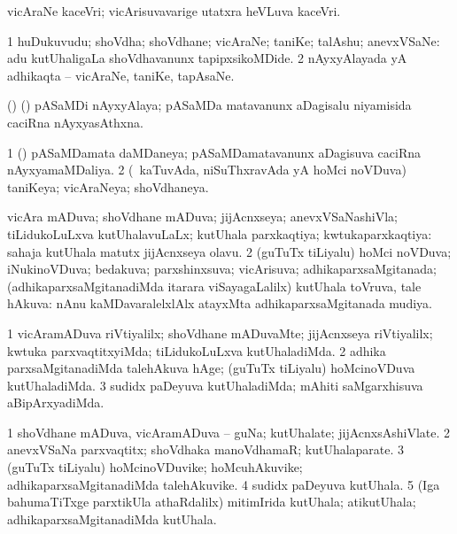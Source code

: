 \bentry
{}
\gl{\nA}
\bmng
vicAraNe kaceVri; vicArisuvavarige utatxra heVLuva kaceVri. 
\emng
\eentry

\bentry
{}
\gl{\nA}
\bmng
\bnum
\num{1} huDukuvudu; shoVdha; shoVdhane; vicAraNe; taniKe; talAshu; anevxVSaNe:  adu kutUhaligaLa shoVdhavanunx tapipxsikoMDide. 
\num{2} nAyxyAlayada yA adhikaqta -- vicAraNe, taniKe, tapAsaNe. 
\enum
\emng

\noindent 
\gl{\pagu}
\bmng
{} (\ca) (\roVkAyx) pASaMDi nAyxyAlaya; pASaMDa matavanunx aDagisalu niyamisida caciRna nAyxyasAthxna. 
\emng
\eentry

\bentry
{}
\gl{\gu}
\bmng
\bnum
\num{1} (\ca) pASaMDamata daMDaneya; pASaMDamatavanunx aDagisuva caciRna nAyxyamaMDaliya. 
\num{2} (\kanmu\ kaTuvAda, niSuThxravAda yA hoMci noVDuva) taniKeya; vicAraNeya; shoVdhaneya. 
\enum
\emng
\eentry

\bentry
{}
\gl{\gu}
\bmng
\bnum
{} vicAra mADuva; shoVdhane mADuva; jijAcnxseya; anevxVSaNashiVla; tiLidukoLuLxva kutUhalavuLaLx; kutUhala parxkaqtiya; kwtukaparxkaqtiya: 
\banum
{}  sahaja kutUhala matutx jijAcnxseya olavu. 
\eanum
\numie
\num{2} (guTuTx tiLiyalu) hoMci noVDuva; iNukinoVDuva; bedakuva; parxshinxsuva; vicArisuva; adhikaparxsaMgitanada; (adhikaparxsaMgitanadiMda itarara viSayagaLalilx) kutUhala toVruva, tale hAkuva:  nAnu kaMDavaralelxlAlx atayxMta adhikaparxsaMgitanada mudiya. 
\enum
\emng
\eentry

\bentry
{}
\gl{\kirxvi}
\bmng
\bnum
\num{1} vicAramADuva riVtiyalilx; shoVdhane mADuvaMte; jijAcnxseya riVtiyalilx; kwtuka parxvaqtitxyiMda; tiLidukoLuLxva kutUhaladiMda. 
\num{2} adhika parxsaMgitanadiMda talehAkuva hAge; (guTuTx tiLiyalu) hoMcinoVDuva kutUhaladiMda. 
\num{3} sudidx paDeyuva kutUhaladiMda; mAhiti saMgarxhisuva aBipArxyadiMda. 
\enum
\emng
\eentry

\bentry
{}
\gl{\nA}
\bmng
\bnum
\num{1} shoVdhane mADuva, vicAramADuva -- guNa; kutUhalate; jijAcnxsAshiVlate. 
\num{2} anevxVSaNa parxvaqtitx; shoVdhaka manoVdhamaR; kutUhalaparate. 
\num{3} (guTuTx tiLiyalu) hoMcinoVDuvike; hoMcuhAkuvike; adhikaparxsaMgitanadiMda talehAkuvike. 
\num{4} sudidx paDeyuva kutUhala. 
\num{5} (Iga bahumaTiTxge parxtikUla athaRdalilx) mitimIrida kutUhala; atikutUhala; adhikaparxsaMgitanadiMda kutUhala. 
\enum
\emng
\eentry

